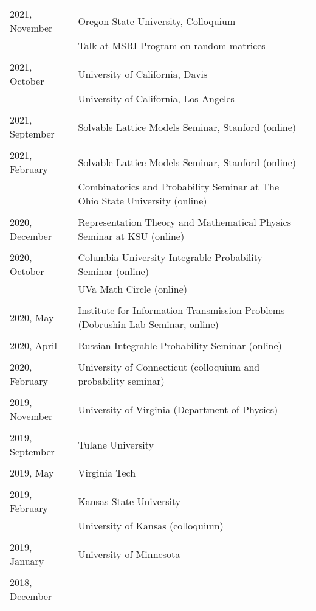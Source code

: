 \documentclass[letterpaper,11pt]{article}
\begin{document}
\begin{longtable}{llc}
	2021, November
	& Oregon State University, Colloquium
	\\
	& Talk at MSRI Program on random matrices
	\\\\
	2021, October
	& University of California, Davis
	\\
	& University of California, Los Angeles
	\\\\
	2021, September 
	& Solvable Lattice Models Seminar, Stanford (online)
	\\\\
	2021, February 
	& Solvable Lattice Models Seminar, Stanford (online)
	\\
	&
	Combinatorics and Probability Seminar at The Ohio State University (online)
	\\\\
	2020, December
	& Representation Theory and Mathematical Physics Seminar at KSU (online)
	\\\\
	2020, October
	& Columbia University Integrable Probability Seminar (online)
	\\
	&
	UVa Math Circle (online)
	\\\\
	2020, May
	& Institute for Information Transmission Problems
	(Dobrushin Lab Seminar, online)
	\\\\
	2020, April
	& Russian Integrable Probability Seminar (online)
	\\\\
	2020, February
	& University of Connecticut (colloquium and probability seminar)
	\\\\
	2019, November
	& University of Virginia (Department of Physics)
	\\\\
	2019, September
	& Tulane University
	\\\\
	2019, May
	& Virginia Tech
	\\\\
	2019, February
	& Kansas State University \\
	& University of Kansas (colloquium)
	\\\\
	2019, January
	& University of Minnesota
	\\\\
	2018, December

\end{longtable}
\end{document}
